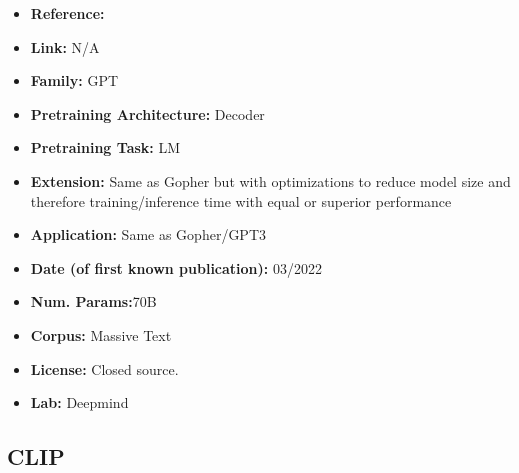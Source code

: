 \documentclass{article}
\begin{document}
            \begin{itemize}
                \item \textbf{Reference:} \href{https://arxiv.org/abs/2203.15556}{}
                \item \textbf{Link:} N/A
                \item \textbf{Family:} GPT 
                \item \textbf{Pretraining Architecture:} Decoder
                \item \textbf{Pretraining Task:} LM
                \item \textbf{Extension:} Same as Gopher but with optimizations to reduce model size and therefore training/inference time with equal or superior performance  
                \item \textbf{Application:} Same as Gopher/GPT3
                \item \textbf{Date (of first known publication):} 03/2022
                \item \textbf{Num. Params:}70B
                \item \textbf{Corpus:} Massive Text
                \item \textbf{License:} Closed source.
                \item \textbf{Lab:} Deepmind
            \end{itemize}

\subsection{CLIP}
\end{document}

